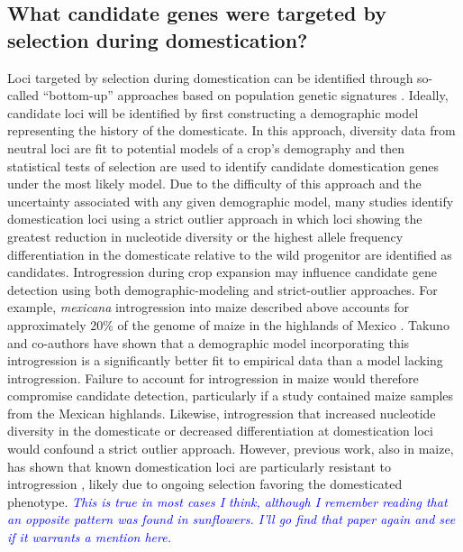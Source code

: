 \documentclass[11pt]{article}
\newcommand{\lwang}[1]{\textcolor{red}{ \emph{\scriptsize  #1}} } %
\newcommand{\gmj}[1]{\textcolor{blue}{ \emph{\scriptsize  #1}} } %
\begin{document}
\subsection*{What candidate genes were targeted by selection during domestication?}
Loci targeted by selection during domestication can be identified through so-called ``bottom-up'' approaches based on population genetic signatures \cite{Ross-Ibarra2007}.
Ideally, candidate loci will be identified by first constructing a demographic model representing the history of the domesticate.
In this approach, diversity data from neutral loci are fit to potential models of a crop's demography and then statistical tests of selection are used to identify candidate domestication genes under the most likely model.
Due to the difficulty of this approach and the uncertainty associated with any given demographic model, many studies identify domestication loci using a strict outlier approach in which loci showing the greatest reduction in nucleotide diversity or the highest allele frequency differentiation in the domesticate relative to the wild progenitor are identified as candidates.
Introgression during crop expansion may influence candidate gene detection using both demographic-modeling and strict-outlier approaches.
For example, \emph{mexicana} introgression into maize described above accounts for approximately 20\% of the genome of maize in the highlands of Mexico \cite{vanHeerwaarden2011}.
Takuno and co-authors \cite{Takuno2015} have shown that a demographic model incorporating this introgression is a significantly better fit to empirical data than a model lacking introgression.
Failure to account for introgression in maize would therefore compromise candidate detection, particularly if a study contained maize samples from the Mexican highlands.
Likewise, introgression that increased nucleotide diversity in the domesticate or decreased differentiation at domestication loci would confound a strict outlier approach.
However, previous work, also in maize, has shown that known domestication loci are particularly resistant to introgression \cite{hufford2013genomic}, likely due to ongoing selection favoring the domesticated phenotype.
\gmj{This is true in most cases I think, although I remember reading that an opposite pattern was found in sunflowers.  I'll go find that paper again and see if it warrants a mention here.}

\end{document}

